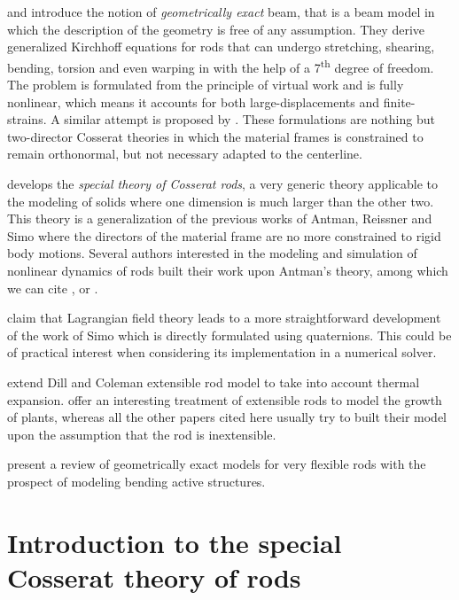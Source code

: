  and  introduce the notion of \emph{geometrically exact} beam, that is a beam model in which the description of the geometry is free of any assumption. They derive generalized Kirchhoff equations for rods that can undergo stretching, shearing, bending, torsion and even warping in \cite{Simo1991} with the help of a 7\textsuperscript{th} degree of freedom. The problem is formulated from the principle of virtual work and is fully nonlinear, which means it accounts for both large-displacements and finite-strains. A similar attempt is proposed by . These formulations are nothing but two-director Cosserat theories in which the material frames is constrained to remain orthonormal, but not necessary adapted to the centerline.

 develops the \emph{special theory of Cosserat rods}, a very generic theory applicable to the modeling of solids where one dimension is much larger than the other two. This theory is a generalization of the previous works of Antman, Reissner and Simo where the directors of the material frame are no more constrained to rigid body motions. Several authors interested in the modeling and simulation of nonlinear dynamics of rods built their work upon Antman's theory, among which we can cite ,  or .

 claim that Lagrangian field theory leads to a more straightforward development of the work of Simo \cite{Simo1991} which is directly formulated using quaternions. This could be of practical interest when considering its implementation in a numerical solver.

 extend Dill and Coleman extensible rod model to take into account thermal expansion.  offer an interesting treatment of extensible rods to model the growth of plants, whereas all the other papers cited here usually try to built their model upon the assumption that the rod is inextensible.

 present a review of geometrically exact models for very flexible rods with the prospect of modeling bending active structures.


\section{Introduction to the special Cosserat theory of rods}\label{sec=cosserat_theory}

